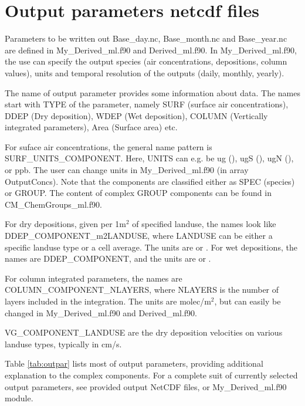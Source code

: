 
\newpage
\section{Output parameters netcdf files}\label{sec:OutputParam}

Parameters to be written out Base\_day.nc, Base\_month.nc and Base\_year.nc are defined in
My\_Derived\_ml.f90 and Derived\_ml.f90. In My\_Derived\_ml.f90, the
use can specify the output species (air concentrations, depositions,
column values), units and temporal resolution of the outputs (daily,
monthly, yearly).

The name of output parameter provides some information about data. The
names start with TYPE of the parameter, namely SURF (surface air
concentrations), DDEP (Dry deposition), WDEP (Wet deposition), COLUMN
(Vertically integrated parameters), Area (Surface area) etc.   

For suface air concentrations, the general name pattern is
SURF\_UNITS\_COMPONENT. Here, UNITS can e.g. be ug (\ug), ugS (\ugS),
ugN (\ugN), or ppb. The user can change units in My\_Derived\_ml.f90
(in array OutputConcs). Note that the components are classified either
as SPEC (species) or GROUP. The content of complex GROUP components
can be found in CM\_ChemGroups\_ml.f90.

For dry depositions, given per 1m$^{2}$ of specified landuse, the
names look like \\ DDEP\_COMPONENT\_m2LANDUSE, where LANDUSE can be
either a specific landuse type or a cell average. The units are \mgSm
or \mgNm. For wet depositions, the names are DDEP\_COMPONENT, and the
units are \mgSl or \mgNl.

For column integrated parameters, the names are
COLUMN\_COMPONENT\_NLAYERS, where NLAYERS is the number of layers
included in the integration. The units are molec/m$^2$, but can easily
be changed in My\_Derived\_ml.f90 and Derived\_ml.f90.

VG\_COMPONENT\_LANDUSE are the dry deposition velocities on various
landuse types, typically in cm/s.


Table \ref{tab:outpar} lists most of output parameters, providing
additional explanation to the complex components. For a complete suit
of currently selected output parameters, see provided output
NetCDF files, or My\_Derived\_ml.f90 module.


